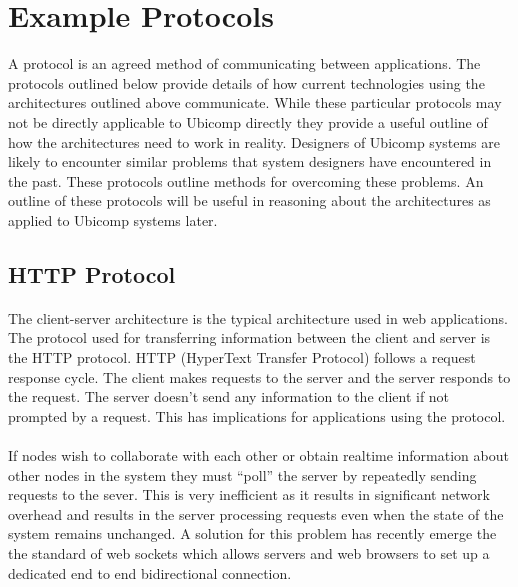 \documentclass[11pt]{amsart}
\begin{document}
\section{Example Protocols}

A protocol is an agreed method of communicating between applications. The protocols outlined below provide details of how current technologies using the architectures outlined above communicate. While these particular protocols may not be directly applicable to Ubicomp directly they provide a useful outline of how the architectures need to work in reality. Designers of Ubicomp systems are likely to encounter similar problems that system designers have encountered in the past. These protocols outline methods for overcoming these problems. An outline of these protocols will be useful in reasoning about the architectures as applied to Ubicomp systems later.

\subsection{HTTP Protocol}
\paragraph{}
The client-server architecture is the typical architecture used in web applications. The protocol used for transferring information between the client and server is the HTTP protocol. HTTP (HyperText Transfer Protocol) follows a request response cycle. The client makes requests to the server and the server responds to the request. The server doesn't send any information to the client if not prompted by a request. This has implications for applications using the protocol. 
\paragraph{}
If nodes wish to collaborate with each other or obtain realtime information about other nodes in the system they must ``poll'' the server by repeatedly sending requests to the sever. This is very inefficient as it results in significant network overhead and results in the server processing requests even when the state of the system remains unchanged. A solution for this problem has recently emerge the the standard of web sockets which allows servers and web browsers to set up a dedicated end to end bidirectional connection.
\end{document}
